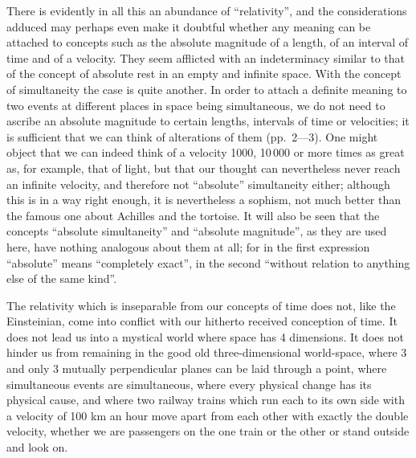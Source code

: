 \documentclass[12pt,a4paper]{article}
\begin{document}
There is evidently in all this an abundance of ``relativity'', and the
considerations adduced may perhaps even make it doubtful whether any meaning
can be attached to concepts such as the absolute magnitude of a length, of an
interval of time and of a velocity. They seem afflicted with an indeterminacy
similar to that of the concept of absolute rest in an empty and infinite
space. With the concept of simultaneity the case is quite another. In order to
attach a definite meaning to two events at different places in space being
simultaneous, we do not need to ascribe an absolute magnitude to certain
lengths, intervals of time or velocities; it is sufficient that we can think
of alterations of them (pp.~2---3). One might object that we can indeed think
of a velocity 1000, 10\,000 or more times as great as, for example, that of
light, but
that our thought can nevertheless never reach an infinite velocity, and
therefore not ``absolute'' simultaneity either; although this is in a way
right enough, it is nevertheless a sophism, not much better than the famous
one about Achilles and the tortoise. It will also be seen that the concepts
``absolute simultaneity'' and ``absolute magnitude'', as they are used here,
have nothing analogous about them at all; for in the first expression
``absolute'' means ``completely exact'', in the second ``without relation to
anything else of the same kind''.

The relativity which is inseparable from our concepts of time does not, like
the Einsteinian, come into conflict with our hitherto received conception of
time. It does not lead us into a mystical world where space has 4 dimensions.
It does not hinder us from remaining in the good old three-dimensional
world-space, where 3 and only 3 mutually perpendicular planes can be laid
through a point, where simultaneous events are simultaneous, where every
physical change has its physical cause, and where two railway trains which run
each to its own side with a velocity of 100 km an hour move apart from each
other with exactly the double velocity, whether we are passengers on the one
train or the other or stand outside and look on.
\end{document}
